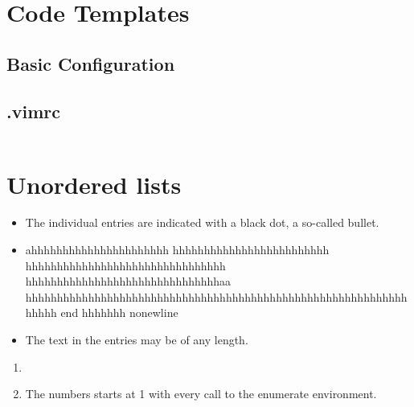 \documentclass{article}
\newcommand{\regcode}[1]{\inputminted{cpp}{code/#1}}
\begin{document}
\tableofcontents
\clearpage

\section{Code Templates}
	\subsection{Basic Configuration}
		\subsection{.vimrc}
			\regcode{main.cpp}

\section{Unordered lists}

\begin{itemize}
\item The individual entries are indicated with a black dot, a so-called bullet.
\item ahhhhhhhhhhhhhhhhhhhhhh hhhhhhhhhhhhhhhhhhhhhhhhh hhhhhhhhhhhhhhhhhhhhhhhhhhhhhhhh hhhhhhhhhhhhhhhhhhhhhhhhhhhhhhhaa\\hhhhhhhhhhhhhhhhhhhhhhhhhhhhhhhhhhhhhhhhhhhhhhhhhhhhhhhhhhhhhhhhhh end\newline
hhhhhhh
nonewline
\item The text in the entries may be of any length.
\end{itemize}

\begin{enumerate}
\item 
\item The numbers starts at 1 with every call to the enumerate environment.
\end{enumerate}
\end{document}
